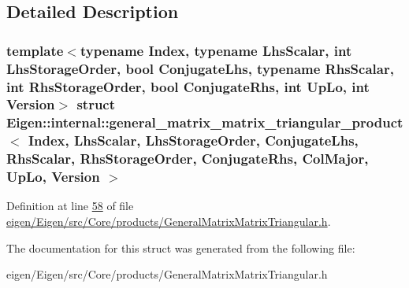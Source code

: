 \subsection{Detailed Description}
\subsubsection*{template$<$typename Index, typename Lhs\+Scalar, int Lhs\+Storage\+Order, bool Conjugate\+Lhs, typename Rhs\+Scalar, int Rhs\+Storage\+Order, bool Conjugate\+Rhs, int Up\+Lo, int Version$>$\newline
struct Eigen\+::internal\+::general\+\_\+matrix\+\_\+matrix\+\_\+triangular\+\_\+product$<$ Index, Lhs\+Scalar, Lhs\+Storage\+Order, Conjugate\+Lhs, Rhs\+Scalar, Rhs\+Storage\+Order, Conjugate\+Rhs, Col\+Major, Up\+Lo, Version $>$}



Definition at line \hyperlink{eigen_2_eigen_2src_2_core_2products_2_general_matrix_matrix_triangular_8h_source_l00058}{58} of file \hyperlink{eigen_2_eigen_2src_2_core_2products_2_general_matrix_matrix_triangular_8h_source}{eigen/\+Eigen/src/\+Core/products/\+General\+Matrix\+Matrix\+Triangular.\+h}.



The documentation for this struct was generated from the following file\+:\begin{DoxyCompactItemize}
\item 
eigen/\+Eigen/src/\+Core/products/\+General\+Matrix\+Matrix\+Triangular.\+h\end{DoxyCompactItemize}
